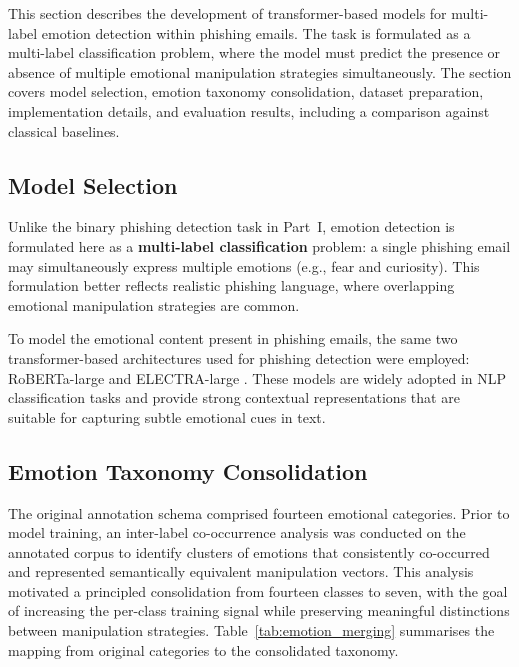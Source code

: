 This section describes the development of transformer-based models for multi-label emotion detection within phishing emails. The task is formulated as a multi-label classification problem, where the model must predict the presence or absence of multiple emotional manipulation strategies simultaneously. The section covers model selection, emotion taxonomy consolidation, dataset preparation, implementation details, and evaluation results, including a comparison against classical baselines.

\subsection{Model Selection}
\label{sec:emotion_model_selection}

Unlike the binary phishing detection task in Part~I, emotion detection is formulated here as a \textbf{multi-label classification} problem: a single phishing email may simultaneously express multiple emotions (e.g., fear and curiosity). This formulation better reflects realistic phishing language, where overlapping emotional manipulation strategies are common.

To model the emotional content present in phishing emails, the same two transformer-based architectures used for phishing detection were employed: \acs{RoBERTa}-large \cite{liu2019roberta} and \acs{ELECTRA}-large \cite{clark2020electra}. These models are widely adopted in \acs{NLP} classification tasks and provide strong contextual representations that are suitable for capturing subtle emotional cues in text.

\subsection{Emotion Taxonomy Consolidation}
\label{sec:emotion_taxonomy}

The original annotation schema comprised fourteen emotional categories. Prior to model training, an inter-label co-occurrence analysis was conducted on the annotated corpus to identify clusters of emotions that consistently co-occurred and represented semantically equivalent manipulation vectors. This analysis motivated a principled consolidation from fourteen classes to seven, with the goal of increasing the per-class training signal while preserving meaningful distinctions between manipulation strategies. Table~\ref{tab:emotion_merging} summarises the mapping from original categories to the consolidated taxonomy.

